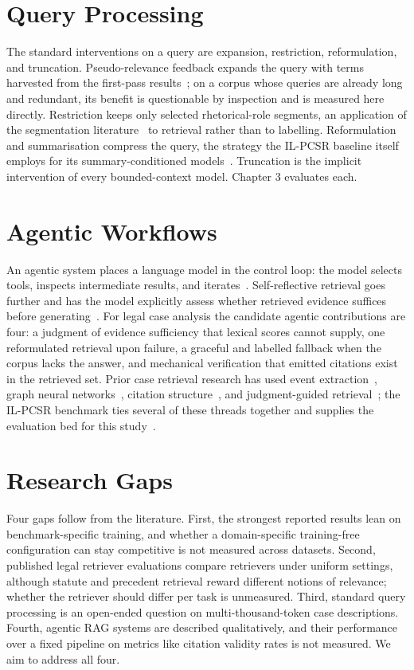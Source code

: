 \documentclass{mnnit}
\begin{document}
\section{Query Processing}
The standard interventions on a query are expansion, restriction,
reformulation, and truncation. Pseudo-relevance feedback expands
the query with terms harvested from the first-pass
results~\cite{rocchio}; on a corpus whose queries are already
long and redundant, its benefit is questionable by inspection and
is measured here directly. Restriction keeps only selected
rhetorical-role segments, an application of the segmentation
literature~\cite{malik2022rr,bhattacharya2023deeprhole} to
retrieval rather than to labelling. Reformulation and
summarisation compress the query, the strategy the IL-PCSR
baseline itself employs for its summary-conditioned
models~\cite{ilpcsr}. Truncation is the implicit intervention of
every bounded-context model. Chapter 3 evaluates each.

\section{Agentic Workflows}
An agentic system places a language model in the control loop:
the model selects tools, inspects intermediate results, and
iterates~\cite{react,agenticrag}. Self-reflective retrieval goes
further and has the model explicitly assess whether retrieved
evidence suffices before generating~\cite{selfrag}. For legal
case analysis the candidate agentic contributions are four: a
judgment of evidence sufficiency that lexical scores cannot
supply, one reformulated retrieval upon failure, a graceful and
labelled fallback when the corpus lacks the answer, and
mechanical verification that emitted citations exist in the
retrieved set. Prior case retrieval research has used event
extraction~\cite{joshi2023ucreat}, graph neural
networks~\cite{tang2024casegnn,tang2024caselink}, citation
structure~\cite{bhattacharya2020hierspcnet}, and judgment-guided
retrieval~\cite{qin2024ljpretrieval}; the IL-PCSR benchmark ties
several of these threads together and supplies the evaluation
bed for this study~\cite{ilpcsr}.

\section{Research Gaps}
Four gaps follow from the literature. First, the strongest
reported results lean on benchmark-specific training, and
whether a domain-specific training-free configuration can stay
competitive is not measured across datasets. Second, published
legal retriever evaluations compare retrievers under uniform
settings, although statute and precedent retrieval reward
different notions of relevance; whether the retriever should
differ per task is unmeasured. Third, standard query processing
is an open-ended question on multi-thousand-token case
descriptions. Fourth, agentic RAG systems are described
qualitatively, and their performance over a fixed pipeline on
metrics like citation validity rates is not measured. We aim to
address all four.
\end{document}
